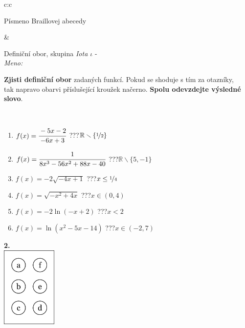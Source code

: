 \documentclass[10pt]{report}
\begin{document}
\begin{tabular}{c:c}
\begin{minipage}[c][104.5mm][t]{0.5\linewidth}
\begin{center}
\begin{minipage}{0.20\linewidth}
\begin{center}
{\small Písmeno Braillovej abecedy}
\end{center}
\end{minipage}
\end{center}
\end{minipage}
&
\begin{minipage}[c][104.5mm][t]{0.5\linewidth}
\begin{center}
\vspace{7mm}
{\huge Definiční obor, skupina \textit{Iota $\iota$} -}\\[5mm]
\textit{Meno:}\phantom{xxxxxxxxxxxxxxxxxxxxxxxxxxxxxxxxxxxxxxxxxxxxxxxxxxxxxxxxxxxxxxxxx}\\[5mm]
\begin{minipage}{0.95\linewidth}
\textbf{Zjisti definiční obor} zadaných funkcí. Pokud se shoduje s tím za otazníky,\\tak napravo obarvi příslušející kroužek načerno. \textbf{Spolu odevzdejte výsledné slovo}.
\end{minipage}
\\[1mm]
\begin{minipage}{0.79\linewidth}
\begin{center}
\begin{varwidth}{\linewidth}
\begin{enumerate}
\normalsizerrr
\item $f(x)=\cfrac{-5x-2}{-6x+3}$\quad \dotfill\; ???\;\dotfill \quad $\mathbb{R}\smallsetminus\{\nicefrac{1}{2}\}$
\item $f(x)=\cfrac{1}{8x^3-56x^2+88x-40}$\quad \dotfill\; ???\;\dotfill \quad $\mathbb{R}\smallsetminus\{5,-1\}$
\item $f(x)=-2\sqrt{-4x+1}$\quad \dotfill\; ???\;\dotfill \quad $x\leq\nicefrac{1}{4}$
\item $f(x)=\sqrt{-x^2+4x}$\quad \dotfill\; ???\;\dotfill \quad $x\in(0 , 4)$
\item $f(x)=-2\ln{(-x+2)}$\quad \dotfill\; ???\;\dotfill \quad $x<2$
\item $f(x)=\ln{(x^2-5x-14)}$\quad \dotfill\; ???\;\dotfill \quad $x\in(-2 , 7)$
\end{enumerate}
\end{varwidth}
\end{center}
\end{minipage}
\begin{minipage}{0.20\linewidth}
\begin{center}
{\Huge\bfseries 2.} \\[2mm]
\includegraphics[height=40mm]{../images/braille.png}

\end{center}
\end{minipage}
\end{center}
\end{minipage}
\end{tabular}
\end{document}
